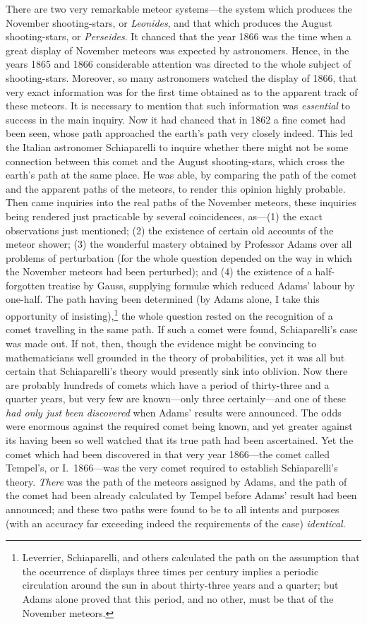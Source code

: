 \documentclass[letterpaper,12pt,oneside,openany]{memoir}
\begin{document}
There are two very remarkable meteor systems---the
system which produces the November shooting-stars,
or \textit{Leonides}, and that which produces the August
shooting-stars, or \textit{Perseides}. It chanced that the year
1866 was the time when a great display of November
meteors was expected by astronomers. Hence, in the
years 1865 and 1866 considerable attention was
directed to the whole subject of shooting-stars. Moreover,
so many astronomers watched the display of
1866, that very exact information was for the first time
obtained as to the apparent track of these meteors. It
is necessary to mention that such information was
\emph{essential} to success in the main inquiry. Now it had
chanced that in 1862 a fine comet had been seen,
whose path approached the earth's path very closely
indeed. This led the Italian astronomer Schiaparelli
to inquire whether there might not be some connection
between this comet and the August shooting-stars,
which cross the earth's path at the same place. He
was able, by comparing the path of the comet and the
apparent paths of the meteors, to render this opinion
highly probable. Then came inquiries into the real
paths of the November meteors, these inquiries being
rendered just practicable by several coincidences, as---(1)
the exact observations just mentioned; (2) the
existence of certain old accounts of the meteor shower;
(3) the wonderful mastery obtained by Professor
Adams over all problems of perturbation (for the
whole question depended on the way in which the
November meteors had been perturbed); and (4) the
existence of a half-forgotten treatise by Gauss, supplying
formul{\ae} which reduced Adams' labour by one-half.
The path having been determined (by Adams
alone, I take this opportunity of
insisting),\footnote{Leverrier, Schiaparelli, and others calculated the path on the
assumption that the occurrence of displays three times per century
implies a periodic circulation around the sun in about thirty-three
years and a quarter; but Adams alone proved that this period, and
no other, must be that of the November meteors.}
the
whole question rested on the recognition of a comet
travelling in the same path. If such a comet were
found, Schiaparelli's case was made out. If not, then,
though the evidence might be convincing to mathematicians
well grounded in the theory of probabilities,
yet it was all but certain that Schiaparelli's theory
would presently sink into oblivion. Now there are
probably hundreds of comets which have a period of
thirty-three and a quarter years, but very few are
known---only three certainly---and one of these \textit{had
only just been discovered} when Adams' results were
announced. The odds were enormous against the
required comet being known, and yet greater against
its having been so well watched that its true path had
been ascertained. Yet the comet which had been discovered
in that very year 1866---the comet called
Tempel's, or I.~1866---was the very comet required to
establish Schiaparelli's theory. \textit{There} was the path of
the meteors assigned by Adams, and the path of the
comet had been already calculated by Tempel before
Adams' result had been announced; and these two
paths were found to be to all intents and purposes
(with an accuracy far exceeding indeed the requirements
of the case) \textit{identical}.
\end{document}
